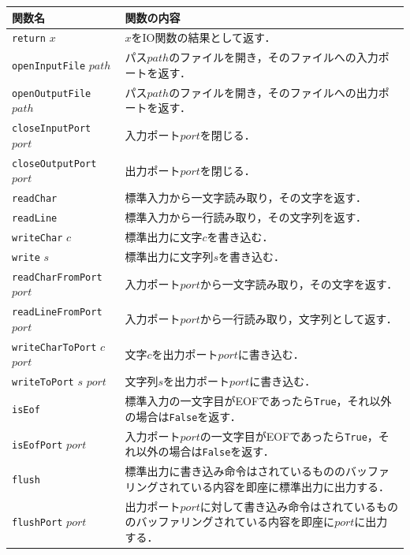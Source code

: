 \begin{table}[h]
  \begin{center}
    \begin{tabular}{ | l | p{9.5cm} |}
    \hline
    関数名 & 関数の内容 \\ \hline
    \texttt{return} $x$ & $x$をIO関数の結果として返す． \\ \hline
    \texttt{openInputFile} $path$ & パス$path$のファイルを開き，そのファイルへの入力ポートを返す． \\ \hline
    \texttt{openOutputFile} $path$ & パス$path$のファイルを開き，そのファイルへの出力ポートを返す． \\ \hline
    \texttt{closeInputPort} $port$ & 入力ポート$port$を閉じる． \\ \hline
    \texttt{closeOutputPort} $port$ & 出力ポート$port$を閉じる． \\ \hline
    \texttt{readChar} & 標準入力から一文字読み取り，その文字を返す． \\ \hline
    \texttt{readLine} & 標準入力から一行読み取り，その文字列を返す． \\ \hline
    \texttt{writeChar} $c$ & 標準出力に文字$c$を書き込む． \\ \hline
    \texttt{write} $s$ & 標準出力に文字列$s$を書き込む． \\ \hline
    \texttt{readCharFromPort} $port$ & 入力ポート$port$から一文字読み取り，その文字を返す． \\ \hline
    \texttt{readLineFromPort} $port$ & 入力ポート$port$から一行読み取り，文字列として返す． \\ \hline
    \texttt{writeCharToPort} $c$ $port$ & 文字$c$を出力ポート$port$に書き込む． \\ \hline
    \texttt{writeToPort} $s$ $port$ & 文字列$s$を出力ポート$port$に書き込む． \\ \hline
    \texttt{isEof} & 標準入力の一文字目がEOFであったら\texttt{True}，それ以外の場合は\texttt{False}を返す． \\ \hline
    \texttt{isEofPort} $port$ & 入力ポート$port$の一文字目がEOFであったら\texttt{True}，それ以外の場合は\texttt{False}を返す． \\ \hline
    \texttt{flush} & 標準出力に書き込み命令はされているもののバッファリングされている内容を即座に標準出力に出力する． \\ \hline
    \texttt{flushPort} $port$ & 出力ポート$port$に対して書き込み命令はされているもののバッファリングされている内容を即座に$port$に出力する． \\ \hline

\end{tabular}
\end{center}
\end{table}
